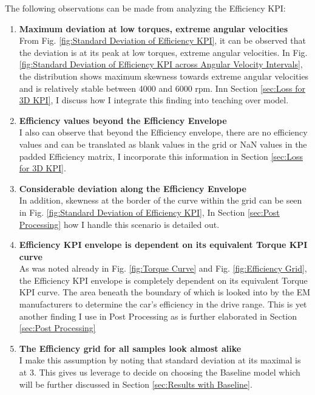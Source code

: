 \documentclass{report} %
\begin{document}
The following observations can be made from analyzing the Efficiency \ac{KPI}:
\begin{enumerate}[nosep]
    \item \textbf{Maximum deviation at low torques, extreme angular velocities}\\
    From Fig. \ref{fig:Standard Deviation of Efficiency KPI}, it can be observed that the deviation is at its peak at low torques, extreme angular velocities. 
    In Fig. \ref{fig:Standard Deviation of Efficiency KPI across Angular Velocity Intervals}, the distribution shows maximum skewness towards 
    extreme angular velocities and is relatively stable between 4000 and 6000 rpm. 
    Inn Section \ref{sec:Loss for 3D KPI}, I discuss how I integrate this finding into teaching over model. 
    \item \textbf{Efficiency values beyond the Efficiency Envelope}\\
    I also can observe that beyond the Efficiency envelope, there are no efficiency values and can be translated as blank values in the grid or \ac{NaN} values 
    in the padded Efficiency matrix, I incorporate this information in Section \ref{sec:Loss for 3D KPI}.
    \item \textbf{Considerable deviation along the Efficiency Envelope}\\
    In addition, skewness at the border of the curve within the grid can be seen in Fig. \ref{fig:Standard Deviation of Efficiency KPI}, 
    In Section \ref{sec:Post Processing} how I handle this scenario is detailed out.
    \item \textbf{Efficiency \ac{KPI} envelope is dependent on its equivalent Torque \ac{KPI} curve}\\
    As was noted already in Fig. \ref{fig:Torque Curve} and Fig. \ref{fig:Efficiency Grid}, the Efficiency \ac{KPI} envelope is completely dependent on its equivalent 
    Torque \ac{KPI} curve. The area beneath the boundary of which is looked into by the \ac{EM} manufacturers to determine the car's efficiency in the drive range.
    This is yet another finding I use in Post Processing as is further elaborated in Section \ref{sec:Post Processing}
    \item \textbf{The Efficiency grid for all samples look almost alike} \\
    I make this assumption by noting that standard deviation at its maximal is at 3. This gives us leverage to decide on choosing the Baseline model which will 
    be further discussed in Section \ref{sec:Results with Baseline}.

\end{enumerate}
\end{document}
